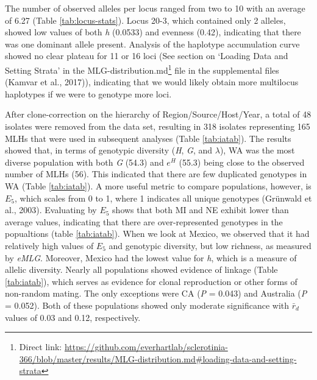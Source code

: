 The number of observed alleles per locus ranged from two to 10 with an
average of 6.27 (Table \ref{tab:locus-stats}). Locus 20-3, which
contained only 2 alleles, showed low values of both \emph{h} (0.0533)
and evenness (0.42), indicating that there was one dominant allele
present. Analysis of the haplotype accumulation curve showed no clear
plateau for 11 or 16 loci (See section on `Loading Data and Setting
Strata' in the MLG-distribution.md\footnote{Direct link:
  \url{https://github.com/everhartlab/sclerotinia-366/blob/master/results/MLG-distribution.md\#loading-data-and-setting-strata}}
file in the supplemental files (Kamvar et al., 2017)), indicating that
we would likely obtain more multilocus haplotypes if we were to genotype
more loci.

After clone-correction on the hierarchy of Region/Source/Host/Year, a
total of 48 isolates were removed from the data set, resulting in 318
isolates representing 165 MLHs that were used in subsequent analyses
(Table \ref{tab:iatab}). The results showed that, in terms of genotypic
diversity (\emph{H}, \emph{G}, and \(\lambda\)), WA was the most diverse
population with both \emph{G} (54.3) and \(e^H\) (55.3) being close to
the observed number of MLHs (56). This indicated that there are few
duplicated genotypes in WA (Table \ref{tab:iatab}). A more useful metric
to compare populations, however, is \(E_5\), which scales from 0 to 1,
where 1 indicates all unique genotypes (Grünwald et al., 2003).
Evaluating by \(E_5\) shows that both MI and NE exhibit lower than
average values, indicating that there are over-represented genotypes in
the popualtions (table \ref{tab:iatab}). When we look at Mexico, we
observed that it had relatively high values of \(E_5\) and genotypic
diversity, but low richness, as measured by \emph{eMLG}. Moreover,
Mexico had the lowest value for \emph{h}, which is a measure of allelic
diversity. Nearly all populations showed evidence of linkage (Table
\ref{tab:iatab}), which serves as evidence for clonal reproduction or
other forms of non-random mating. The only exceptions were CA (\emph{P}
= 0.043) and Australia (\emph{P} = 0.052). Both of these populations
showed only moderate significance with \(\bar{r}_d\) values of 0.03 and
0.12, respectively.

